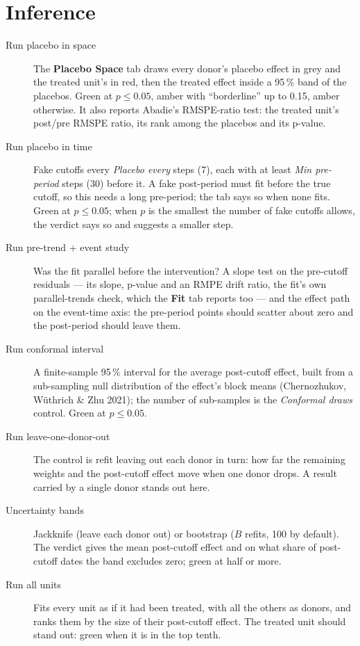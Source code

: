\documentclass[11pt]{report}
\newcommand{\tab}[1]{\textbf{#1}}
\begin{document}
\section{Inference}
\begin{description}
  \item[Run placebo in space] The \tab{Placebo Space} tab draws every donor's placebo
        effect in grey and the treated unit's in red, then the treated effect inside a
        95\,\% band of the placebos. Green at $p \le 0.05$, amber with ``borderline'' up to
        0.15, amber otherwise. It also reports Abadie's RMSPE-ratio test: the treated
        unit's post/pre RMSPE ratio, its rank among the placebos and its p-value.
  \item[Run placebo in time] Fake cutoffs every \emph{Placebo every} steps (7), each with
        at least \emph{Min pre-period} steps (30) before it. A fake post-period must fit
        before the true cutoff, so this needs a long pre-period; the tab says so when
        none fits. Green at $p \le 0.05$; when $p$ is the smallest the number of fake
        cutoffs allows, the verdict says so and suggests a smaller step.
  \item[Run pre-trend + event study] Was the fit parallel before the intervention? A
        slope test on the pre-cutoff residuals --- its slope, p-value and an RMPE drift
        ratio, the fit's own parallel-trends check, which the \tab{Fit} tab reports too
        --- and the effect path on the event-time axis: the pre-period points should
        scatter about zero and the post-period should leave them.
  \item[Run conformal interval] A finite-sample 95\,\% interval for the average
        post-cutoff effect, built from a sub-sampling null distribution of the effect's
        block means (Chernozhukov, W\"uthrich \& Zhu 2021); the number of sub-samples is
        the \emph{Conformal draws} control. Green at $p \le 0.05$.
  \item[Run leave-one-donor-out] The control is refit leaving out each donor in turn:
        how far the remaining weights and the post-cutoff effect move when one donor
        drops. A result carried by a single donor stands out here.
  \item[Uncertainty bands] Jackknife (leave each donor out) or bootstrap ($B$ refits,
        100 by default). The verdict gives the mean post-cutoff effect and on what
        share of post-cutoff dates the band excludes zero; green at half or more.
  \item[Run all units] Fits every unit as if it had been treated, with all the others as
        donors, and ranks them by the size of their post-cutoff effect. The treated unit
        should stand out: green when it is in the top tenth.
\end{description}
\end{document}
